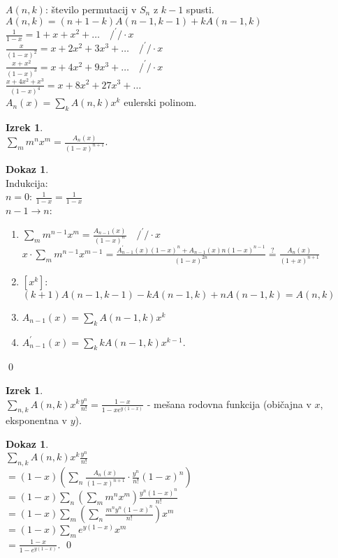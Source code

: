 \documentclass[a4paper, 12pt]{book}
\theoremstyle{definition}
\newtheorem{theorem}[counter]{Izrek}
\newtheorem{pro}[counter]{Dokaz}
\theoremstyle{remark}
\begin{document}
$A(n,k)$: število permutacij v $S_n$ z $k-1$ spusti. \\
$A(n,k) = (n+1-k) A(n-1,k-1) + k A(n-1,k)$ \\
$\frac{1}{1-x} = 1 + x + x^2 + \dots \quad /^{'} / \cdot x$ \\
$\frac{x}{(1-x)^2} = x + 2x^2 + 3x^3 + \dots \quad /^{'} / \cdot x$ \\
$\frac{x+x^2}{(1-x)^3} = x + 4x^2 + 9x^3 + \dots \quad /^{'} / \cdot x$ \\
$\frac{x+4x^2+x^3}{(1-x)^4} = x + 8x^2 + 27x^3 + \dots$ \\
$A_n(x) = \sum_k A(n,k) x^k$ eulerski polinom.
\begin{theorem} \text{} \\
  $\sum_m m^n x^m = \frac{A_n(x)}{(1-x)^{n+1}}$.
\end{theorem}
\begin{pro} \text{} \\
  Indukcija: \\
  $n=0$: $\frac{1}{1-x} = \frac{1}{1-x}$ \\
  $n-1 \to n$:
  \begin{enumerate}[label={}]
    \item $\sum_m m^{n-1} x^m = \frac{A_{n-1}(x)}{(1-x)^n} \quad /^{'} / \cdot x$ \\
      $x \cdot \sum_m m^{n-1} x^{m-1} = \frac{A_{n-1}^{'}(x)(1-x)^n + A_{n-1}(x)n(1-x)^{n-1}}{(1-x)^{2n}}
      \stackrel{?}{=} \frac{A_n(x)}{(1+x)^{n+1}}$
    \item $[x^k]$: $(k+1) A(n-1,k-1) - k A(n-1,k) + n A(n-1,k) = A(n,k)$ \checkmark
    \item $A_{n-1}(x) = \sum_k A(n-1,k) x^k$
    \item $A_{n-1}^{'}(x) = \sum_k k A(n-1,k) x^{k-1}$.
  \end{enumerate}
  \qed
\end{pro}
\begin{theorem} \text{} \\
  $\sum_{n,k} A(n,k) x^k \frac{y^n}{n!} = \frac{1-x}{1-x e^{y(1-x)}}$ -
  mešana rodovna funkcija (običajna v $x$, eksponentna v $y$).
\end{theorem}
\begin{pro} \text{} \\
  $\sum_{n,k} A(n,k) x^k \frac{y^n}{n!} $ \\
  $= (1-x) \left( \sum_n \frac{A_n(x)}{(1-x)^{n+1}} \cdot \frac{y^n}{n!} (1-x)^n\right)$ \\
  $= (1-x)\sum_n \left( \sum_m m^n x^m \right) \frac{y^n (1-x)^n}{n!}$ \\
  $= (1-x) \sum_m \left( \sum_n \frac{m^n y^n (1-x)^n}{n!} \right) x^m$ \\
  $= (1-x) \sum_m e^{y(1-x)} x^m$ \\
  $= \frac{1-x}{1 - e^{y(1-x)}}$.
  \qed
\end{pro}
\end{document}
